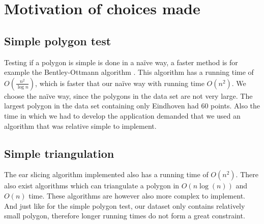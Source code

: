 \section{Motivation of choices made}
\label{sec:MotivationOfChoicesMade}
\subsection{Simple polygon test}
\label{subsec:SimplePolygonTest}
Testing if a polygon is simple is done in a naïve way, a faster method is for example the Bentley-Ottmann algorithm \cite{Bentley79}. This algorithm has a running time of $O(\frac{n^2}{\log{n}})$, which is faster that our naïve way with running time $O(n^2)$. We choose the naïve way, since the polygons in the data set are not very large. The largest polygon in the data set containing only Eindhoven had 60 points. Also the time in which we had to develop the application demanded that we used an algorithm that was relative simple to implement.

\subsection{Simple triangulation}
\label{subsec:SimpleTriangulation}
The ear slicing algorithm implemented also has a running time of $O(n^2)$. There also exist algorithms which can triangulate a polygon in $O(n\log(n))$ and $O(n)$ time. These algorithms are however also more complex to implement. And just like for the simple polygon test, our dataset only contains relatively small polygon, therefore longer running times do not form a great constraint.
